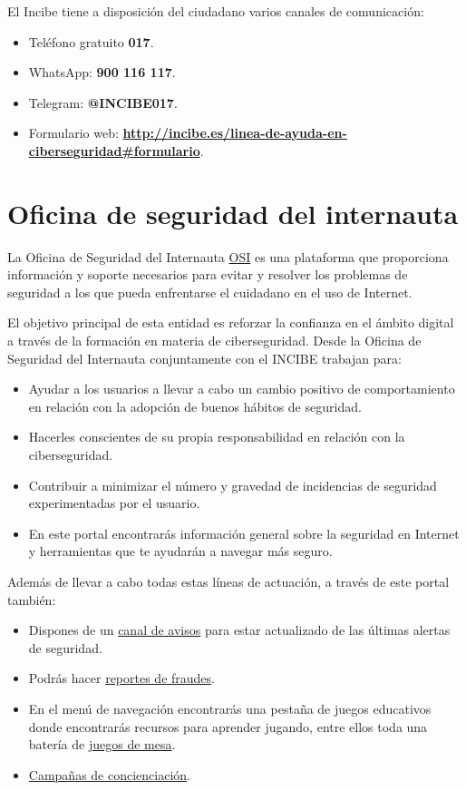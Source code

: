 \documentclass[
  spanish,
  a4paper,
  openany]{book}
\begin{document}
El Incibe tiene a disposición del ciudadano varios canales de comunicación:

\begin{itemize}
\item
  Teléfono gratuito \textbf{017}.
\item
  WhatsApp: \textbf{900 116 117}.
\item
  Telegram: \textbf{@INCIBE017}.
\item
  Formulario web: \textbf{\url{http://incibe.es/linea-de-ayuda-en-ciberseguridad\#formulario}}.
\end{itemize}

\hypertarget{oficina-de-seguridad-del-internauta}{%
\section{Oficina de seguridad del internauta}\label{oficina-de-seguridad-del-internauta}}

La Oficina de Seguridad del Internauta \href{https://www.osi.es/}{OSI} es una plataforma que proporciona información y soporte necesarios para evitar y resolver los problemas de seguridad a los que pueda enfrentarse el cuidadano en el uso de Internet.

El objetivo principal de esta entidad es reforzar la confianza en el ámbito digital a través de la formación en materia de ciberseguridad. Desde la Oficina de Seguridad del Internauta conjuntamente con el INCIBE trabajan para:

\begin{itemize}
\item
  Ayudar a los usuarios a llevar a cabo un cambio positivo de comportamiento en relación con la adopción de buenos hábitos de seguridad.
\item
  Hacerles conscientes de su propia responsabilidad en relación con la ciberseguridad.
\item
  Contribuir a minimizar el número y gravedad de incidencias de seguridad experimentadas por el usuario.
\item
  En este portal encontrarás información general sobre la seguridad en Internet y herramientas que te ayudarán a navegar más seguro.
\end{itemize}

Además de llevar a cabo todas estas líneas de actuación, a través de este portal también:

\begin{itemize}
\item
  Dispones de un \href{https://www.osi.es/es/actualidad/avisos}{canal de avisos} para estar actualizado de las últimas alertas de seguridad.
\item
  Podrás hacer \href{https://www.osi.es/es/reporte-de-fraude}{reportes de fraudes}.
\item
  En el menú de navegación encontrarás una pestaña de juegos educativos donde encontrarás recursos para aprender jugando, entre ellos toda una batería de \href{https://www.osi.es/es/juegos-mesa}{juegos de mesa}.
\item
  \href{https://www.osi.es/es/campanas}{Campañas de concienciación}.
\end{itemize}
\end{document}
